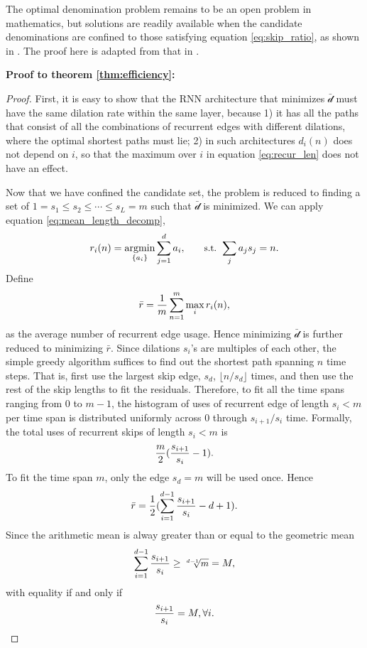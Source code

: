 \documentclass{article}
\DeclareMathOperator*{\argmin}{argmin}
\begin{document}
The optimal denomination problem remains to be an open problem in mathematics, but solutions are readily available when the candidate denominations are confined to those satisfying equation \eqref{eq:skip_ratio}, as shown in \cite{caianiello1982systemic}. The proof here is adapted from that in \cite{caianiello1982systemic}.

{\bf Proof to theorem \ref{thm:efficiency}:}
\begin{proof}
\vspace*{-0.05in}
First, it is easy to show that the RNN architecture that minimizes $\bar{\mathcal{d}}$ must have the same dilation rate within the same layer, because 1) it has all the paths that consist of all the combinations of recurrent edges with different dilations, where the optimal shortest paths must lie; 2) in such architectures $d_i(n)$ does not depend on $i$, so that the maximum over $i$ in equation \eqref{eq:recur_len} does not have an effect.
  
Now that we have confined the candidate set, the problem is reduced to finding a set of $1=s_1 \leq s_2 \leq \cdots \leq s_L=m$ such that $\bar{\mathcal{d}}$ is minimized. We can apply equation \eqref{eq:mean_length_decomp},
\begin{equation}
\small
r_i(n) = \argmin_{\{a_i\}} \sum_{j=1}^d a_i, \qquad\mbox{s.t. } \sum_j a_j s_j = n.
\end{equation}
Define
\begin{equation}
\small
\bar{r}=\frac{1}{m} \sum_{n=1}^{m} \max_i r_i(n),
\end{equation}
as the average number of recurrent edge usage. Hence minimizing $\bar{\mathcal{d}}$ is further reduced to minimizing $\bar{r}$.  Since dilations $s_i$'s are multiples of each other, the simple greedy algorithm suffices to find out the shortest path spanning $n$ time steps. That is, first use the largest skip edge, $s_d$, $\lfloor n / s_d \rfloor$ times, and then use the rest of the skip lengths to fit the residuals. Therefore, to fit all the time spans ranging from $0$ to $m-1$, the histogram of uses of recurrent edge of length $s_i<m$ per time span is distributed uniformly across 0 through $s_{i+1}/s_i$ time. Formally, the total uses of recurrent skips of length $s_i<m$ is
\begin{equation}
\small
\frac{m}{2} (\frac{s_{i+1}}{s_{i}} - 1).
\end{equation}
To fit the time span $m$, only the edge $s_d = m$ will be used once. Hence
\begin{equation}
\small
\bar{r} = \frac{1}{2} (\sum_{i=1}^{d-1} \frac{s_{i+1}}{s_i} - d + 1 ).
\end{equation}
Since the arithmetic mean is alway greater than or equal to the geometric mean
\begin{equation}
\small
\sum_{i=1}^{d-1} \frac{s_{i+1}}{s_i} \geq \sqrt[d-1]{m} = M,
\end{equation}
with equality if and only if
\begin{equation}
\small
\frac{s_{i+1}}{s_i} = M, \forall i.
\end{equation}
  
\end{proof}
\end{document}
